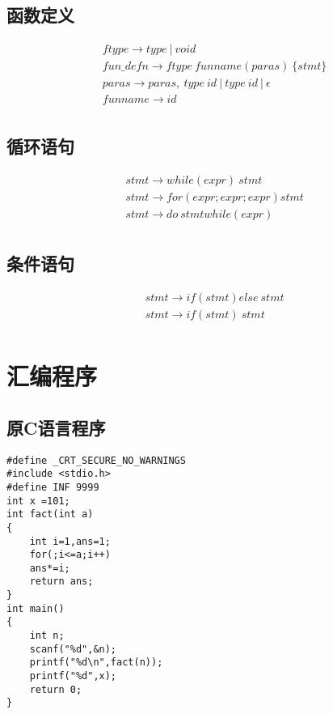 \documentclass[lang=cn,11pt]{elegantpaper}
\begin{document}
	\subsection{函数定义}
		\begin{equation*}
		\begin{split}
			&ftype \rightarrow type\ |\ void \\
			&fun\_defn \rightarrow ftype\ funname(paras)\ \{stmt\} \\
			&paras \rightarrow paras,\ type\ id\ |\ type\ id\ |\ \epsilon \\
			&funname \rightarrow id \\
		\end{split}
	\end{equation*}
	\subsection{循环语句}
		\begin{equation*}
			\begin{split}
				&stmt \rightarrow while(expr)\ stmt \\
				&stmt \rightarrow for(expr;expr;expr) stmt \\
				&stmt \rightarrow do\ stmt while(expr) \\
			\end{split}
		\end{equation*}
	\subsection{条件语句}
		\begin{equation*}
		\begin{split}
			&stmt \rightarrow if(stmt) else\ stmt \\
			&stmt \rightarrow if(stmt)\ stmt \\
		\end{split}
		\end{equation*}
	\section{汇编程序}
	\subsection{原C语言程序}
	\begin{lstlisting}
#define _CRT_SECURE_NO_WARNINGS
#include <stdio.h>
#define INF 9999
int x =101;
int fact(int a)
{
	int i=1,ans=1;
	for(;i<=a;i++)
	ans*=i;
	return ans;
}
int main()
{
	int n;
	scanf("%d",&n);
	printf("%d\n",fact(n));
	printf("%d",x);
	return 0;
}
	\end{lstlisting}
\end{document}
